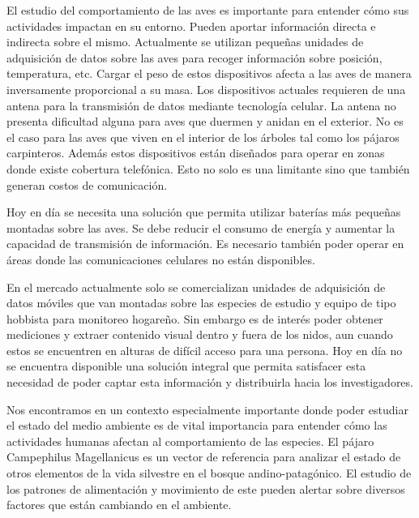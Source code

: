 %

%


El estudio del comportamiento de las aves es importante para entender cómo sus actividades impactan en su entorno. Pueden aportar información directa e indirecta sobre el mismo. Actualmente se utilizan pequeñas unidades de adquisición de datos sobre las aves para recoger información sobre posición, temperatura, etc. 
Cargar el peso de estos dispositivos afecta a las aves de manera inversamente proporcional a su masa. Los dispositivos actuales requieren de una antena para la transmisión de datos mediante tecnología celular. La antena no presenta dificultad alguna para aves que duermen y anidan en el exterior. No es el caso para las aves que viven en el interior de los árboles tal como los pájaros carpinteros. Además estos dispositivos están diseñados para operar en zonas donde existe cobertura telefónica. Esto no solo es una limitante sino que también generan costos de comunicación.

Hoy en día se necesita una solución que permita utilizar baterías más pequeñas montadas sobre las aves. Se debe reducir el consumo de energía y aumentar la capacidad de transmisión de información. Es necesario también poder operar en áreas donde las comunicaciones celulares no están disponibles.

En el mercado actualmente solo se comercializan unidades de adquisición de datos móviles que van montadas sobre las especies de estudio y equipo de tipo hobbista para monitoreo hogareño. Sin embargo es de interés poder obtener mediciones y extraer contenido visual dentro y fuera de los nidos, aun cuando estos se encuentren en alturas de difícil acceso para una persona. Hoy en día no se encuentra disponible una solución integral que permita satisfacer esta necesidad de poder captar esta información y distribuirla hacia los investigadores.


Nos encontramos en un contexto especialmente importante donde poder estudiar el estado del medio ambiente es de vital importancia para entender cómo las actividades humanas afectan al comportamiento de las especies. El pájaro Campephilus Magellanicus es un vector de referencia para analizar el estado de otros elementos de la vida silvestre en el bosque andino-patagónico.  El estudio de los patrones de alimentación y movimiento de este pueden alertar sobre diversos factores que están cambiando en el ambiente.

%